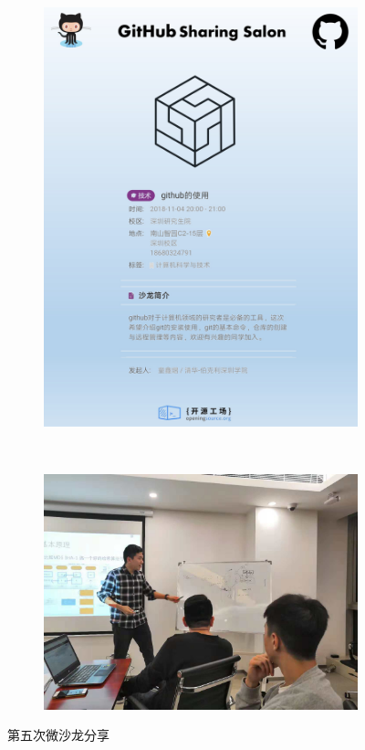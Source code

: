 \documentclass[12pt]{ctexart}
\begin{document}
\begin{figure}[!ht]
\centering
  \begin{subfigure}[b]{0.4\textwidth}
  \includegraphics[width=\textwidth]{5/poster.jpg}  
    \end{subfigure}~
      \begin{subfigure}[b]{0.5\textwidth}
  \includegraphics[width=\textwidth]{5/wesalon.jpeg}  
    \end{subfigure}
    \caption{第五次微沙龙分享}        
\end{figure}
\end{document}
